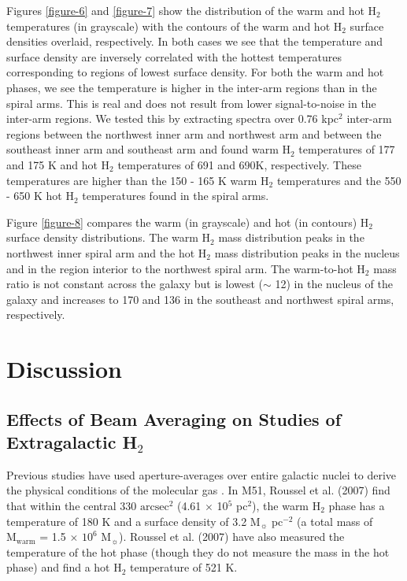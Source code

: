 \documentclass[12pt,preprint]{aastex}
\begin{document}
Figures \ref{figure-6} and \ref{figure-7} show the distribution 
of the warm and hot H$_2$ temperatures (in grayscale) with 
the contours of the warm and hot H$_2$ surface densities overlaid, respectively.  In 
both cases we see that the temperature and surface density 
are inversely correlated with the hottest temperatures 
corresponding to regions of lowest surface density.  
For both the warm and hot phases, we see the temperature 
is higher in the inter-arm regions than in the spiral arms. 
This is real and does not result from lower signal-to-noise 
in the inter-arm regions.   We tested this by extracting spectra 
over 0.76 kpc$^2$ inter-arm regions between the northwest inner arm and northwest 
arm and between the southeast inner arm and southeast arm and found warm H$_2$ 
temperatures of 177 and 175 K and hot H$_2$ temperatures 
of 691 and 690K, respectively.  These temperatures are higher 
than the 150 - 165 K warm H$_2$ temperatures and the 550 - 650 
K hot H$_2$ temperatures found in the spiral arms.

Figure \ref{figure-8} compares the warm (in grayscale) 
and hot (in contours) H$_2$ surface density distributions.   
The warm H$_2$ mass distribution peaks
in the northwest inner spiral arm and the hot H$_2$ 
mass distribution peaks in the nucleus and in the 
region interior to the northwest spiral arm.  The warm-to-hot 
H$_2$ mass ratio is not constant across 
the galaxy but is lowest ($\sim$ 12) in the nucleus of the 
galaxy and increases to 170 and 136 in the southeast 
and northwest spiral arms, respectively.

\section{Discussion}

\subsection{Effects of Beam Averaging on Studies of Extragalactic H$_2$}

Previous studies have used aperture-averages over entire galactic
nuclei to derive the physical conditions of the molecular gas
\citep{rig02, hig06, rou07}.  In M51, Roussel et al. (2007) find that within
the central 330 $\mathrm{arcsec^2}$ (4.61 $\times$ 10$^5$ pc$^2$),
the warm H$_2$ phase has a temperature of 180 K and 
a surface density of 3.2 $\mathrm{M_\sun}$ $\mathrm{pc^{-2}}$ 
(a total mass of $\mathrm{M_{warm}}$ = 1.5 $\times$ $\mathrm{10^6}$
$\mathrm{M_\sun}$).  Roussel et al. (2007) have also measured the temperature of
the hot phase (though they do not measure the mass in the hot phase)
and find a hot H$_2$ temperature of 521 K.
\end{document}
